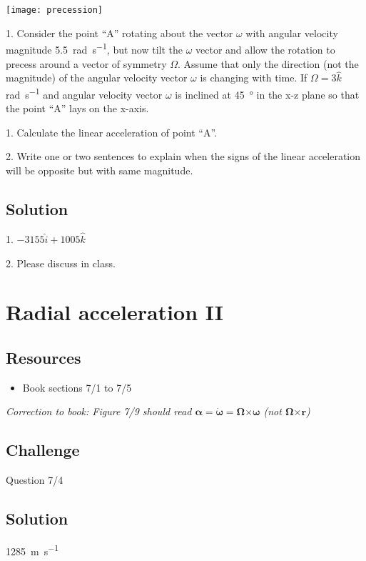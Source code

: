\texttt{[image: precession]}

1. Consider the point ``A'' rotating about the vector $\omega$ with angular velocity magnitude \SI{5.5}{\radian\per\second}, but now tilt the $\omega$ vector and allow the rotation to precess around a vector of symmetry $\Omega$. Assume that only the direction (not the magnitude) of the angular velocity vector $\omega$ is changing with time. If $\Omega = 3\hat{k}$ \si{\radian\per\second} and angular velocity vector $\omega$ is inclined at \SI{45}{\degree} in the x-z plane so that the point ``A'' lays on the x-axis.

1. Calculate the linear acceleration of point ``A''.

2. Write one or two sentences to explain when the signs of the linear acceleration will be opposite but with same magnitude.


\subsection*{Solution}
1. $-3155 \hat{i} + 1005 \hat{k}$

2. Please discuss in class.




\newpage
\section{Radial acceleration II}

\subsection*{Resources}
\begin{itemize}
    \item Book sections 7/1 to 7/5
\end{itemize}

\emph{Correction to book: Figure 7/9 should read $\bm{\alpha} = \bm{\dot{\omega}} = \bm{\Omega} \bm{\times} \bm{\omega}$ (not $\bm{\Omega} \bm{\times} \bm{r}$)}

\subsection*{Challenge}
Question 7/4

\subsection*{Solution}
\SI{1285}{\meter\per\second}




